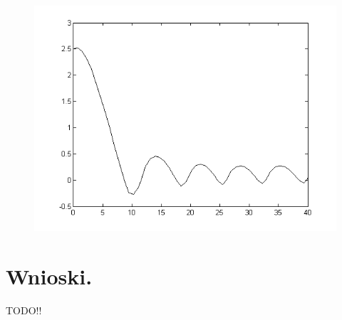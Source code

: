 \documentclass[a4paper,10pt]{article}
\begin{document}
\begin{enumerate}
\begin{figure}[!h]
    \centering
	\includegraphics[width=120mm]{CW3-korekcja-trojpolozeniowyBH-e_a.png}
	\caption{}
    \label{fig:Rysunek}
\end{figure}

\end{enumerate}

\newpage

\section{Wnioski.}\label{sec:wnioski}
TODO!!
\end{document}
